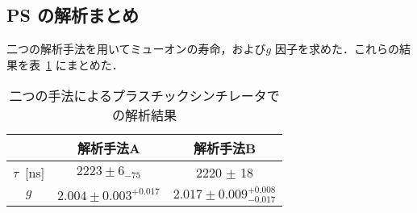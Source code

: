 \subsection{PS の解析まとめ}
\label{subsec:PSmatome}

二つの解析手法を用いてミューオンの寿命，および$g$ 因子を求めた．これらの結果を表~\ref{tab:matome_PS} にまとめた．
\begin{table}[h]
	\centering
	\caption{二つの手法によるプラスチックシンチレータでの解析結果}
	\begin{tabular}{ccc}\toprule
	{} & 解析手法A & 解析手法B \\ \midrule
	$\tau$~[ns]& $2223 \pm 6_{- 75}$ & 2220 $\pm$ 18\\
	$g$ & $2.004 \pm 0.003^{+0.017}$  & $2.017 \pm 0.009 ^{+0.008}_{-0.017}$\\ \bottomrule
	\end{tabular}\label{tab:matome_PS}
\end{table}%



%

